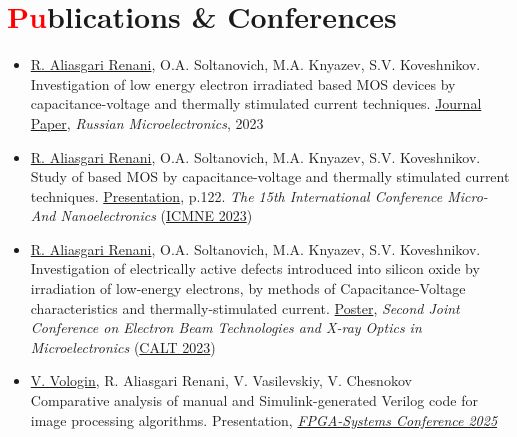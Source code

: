 \documentclass[a4paper,11pt]{article}
\newcommand{\resumesection}[2]{\section{\textcolor{red}{#1}#2}}
\newcommand{\resumeSubHeadingListStart}{\begin{itemize}[leftmargin=0.0in, label={}, itemsep=2pt]}
\newcommand{\resumeSubHeadingListEnd}{\end{itemize}}
\begin{document}
\resumesection{Pu}{blications \& Conferences}
\resumeSubHeadingListStart
    \item \underline{R. Aliasgari Renani}, O.A. Soltanovich, M.A. Knyazev, S.V. Koveshnikov. \\ Investigation of low energy electron irradiated  based MOS devices by capacitance-voltage and thermally stimulated current techniques. \href{https://doi.org/10.1134/S1063739723600516}{Journal Paper}, \textit{Russian Microelectronics}, 2023
    \vspace{2pt}
    \item \underline{R. Aliasgari Renani}, O.A. Soltanovich, M.A. Knyazev, S.V. Koveshnikov. \\ Study of  based MOS by capacitance-voltage and thermally stimulated current techniques. \href{https://icmne.ftian.ru/wp-content/uploads/icmne-2023_e-version.pdf}{Presentation}, p.122. \textit{The 15th International Conference Micro- And Nanoelectronics} (\href{https://icmne.ftian.ru}{ICMNE 2023})
    \vspace{2pt}
    \item \underline{R. Aliasgari Renani}, O.A. Soltanovich, M.A. Knyazev, S.V. Koveshnikov. \\ Investigation of electrically active defects introduced into silicon oxide by irradiation of low-energy electrons, by methods of Capacitance-Voltage characteristics and thermally-stimulated current. \href{https://cebt23.iptm.ru/download/numbered/91.pdf}{Poster}, \textit{Second Joint Conference on Electron Beam Technologies and X-ray Optics in Microelectronics} (\href{https://cebt23.iptm.ru}{CALT 2023})
    \vspace{2pt}
    \item \underline{V. Vologin}, R. Aliasgari Renani, V. Vasilevskiy, V. Chesnokov \\ Comparative analysis of manual and Simulink-generated Verilog code for image processing algorithms. Presentation, \textit{\href{https://meetups.yadro.com/fpga-msk-1125/}{FPGA-Systems Conference 2025}}
\resumeSubHeadingListEnd
\end{document}
